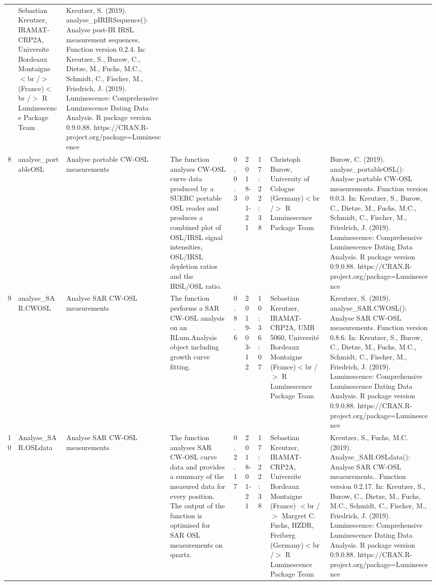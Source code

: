 \begin{table}[ht]
\begin{tabular}{rllllllll}
 & Sebastian Kreutzer, IRAMAT-CRP2A, Universite Bordeaux Montaigne$<$br /$>$ (France)$<$br /$>$  R Luminescence Package Team & Kreutzer, S. (2019). analyse\_pIRIRSequence(): Analyse post-IR IRSL measurement sequences. Function version 0.2.4. In: Kreutzer, S., Burow, C., Dietze, M., Fuchs, M.C., Schmidt, C., Fischer, M., Friedrich, J. (2019). Luminescence: Comprehensive Luminescence Dating Data Analysis. R package version 0.9.0.88. https://CRAN.R-project.org/package=Luminescence
 \\ 
  8 & analyse\_portableOSL & Analyse portable CW-OSL measurements & The function analyses CW-OSL curve data produced by a SUERC portable OSL reader and produces a combined plot of OSL/IRSL signal intensities, OSL/IRSL depletion ratios and the IRSL/OSL ratio. & 0.0.3 & 2018-01-21 & 17:22:38
 & Christoph Burow, University of Cologne (Germany)$<$br /$>$  R Luminescence Package Team & Burow, C. (2019). analyse\_portableOSL(): Analyse portable CW-OSL measurements. Function version 0.0.3. In: Kreutzer, S., Burow, C., Dietze, M., Fuchs, M.C., Schmidt, C., Fischer, M., Friedrich, J. (2019). Luminescence: Comprehensive Luminescence Dating Data Analysis. R package version 0.9.0.88. https://CRAN.R-project.org/package=Luminescence
 \\ 
  9 & analyse\_SAR.CWOSL & Analyse SAR CW-OSL measurements & The function performs a SAR CW-OSL analysis on an RLum.Analysis  object including growth curve fitting. & 0.8.6 & 2019-03-12 & 10:36:07
 & Sebastian Kreutzer, IRAMAT-CRP2A, UMR 5060, Université Bordeaux Montaigne (France)$<$br /$>$  R Luminescence Package Team & Kreutzer, S. (2019). analyse\_SAR.CWOSL(): Analyse SAR CW-OSL measurements. Function version 0.8.6. In: Kreutzer, S., Burow, C., Dietze, M., Fuchs, M.C., Schmidt, C., Fischer, M., Friedrich, J. (2019). Luminescence: Comprehensive Luminescence Dating Data Analysis. R package version 0.9.0.88. https://CRAN.R-project.org/package=Luminescence
 \\ 
  10 & Analyse\_SAR.OSLdata & Analyse SAR CW-OSL measurements. & The function analyses SAR CW-OSL curve data and provides a summary of the measured data for every position. The output of the function is optimised for SAR OSL measurements on quartz. & 0.2.17 & 2018-01-21 & 17:22:38
 & Sebastian Kreutzer, IRAMAT-CRP2A, Universite Bordeaux Montaigne (France) $<$br /$>$ Margret C. Fuchs, HZDR, Freiberg (Germany)$<$br /$>$  R Luminescence Package Team & Kreutzer, S., Fuchs, M.C. (2019). Analyse\_SAR.OSLdata(): Analyse SAR CW-OSL measurements.. Function version 0.2.17. In: Kreutzer, S., Burow, C., Dietze, M., Fuchs, M.C., Schmidt, C., Fischer, M., Friedrich, J. (2019). Luminescence: Comprehensive Luminescence Dating Data Analysis. R package version 0.9.0.88. https://CRAN.R-project.org/package=Luminescence

\end{tabular}
\end{table}
